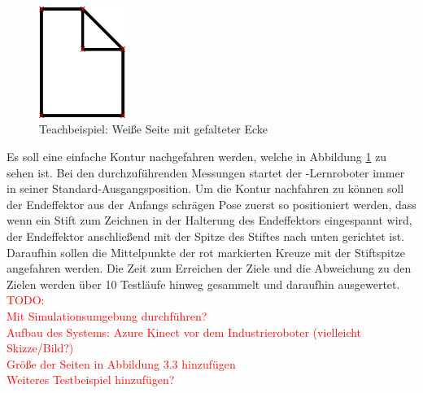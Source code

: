 \begin{figure}[htb]
	\centering
	\includegraphics[width=0.25\textwidth]{images/loesungsweg/white-page-with-folded-corner}
	\caption[Teachbeispiel: Weiße Seite mit gefalteter Ecke]{Teachbeispiel: Weiße Seite mit gefalteter Ecke}
	\label{fig:white_page_with_folded_corner}
\end{figure}
\FloatBarrier

Es soll eine einfache Kontur nachgefahren werden, welche in Abbildung \ref{fig:white_page_with_folded_corner} zu sehen ist. Bei den durchzuführenden Messungen startet der -Lernroboter immer in seiner Standard-Ausgangsposition. Um die Kontur nachfahren zu können soll der Endeffektor aus der Anfangs schrägen Pose zuerst so positioniert werden, dass wenn ein Stift zum Zeichnen in der Halterung des Endeffektors eingespannt wird, der Endeffektor anschließend mit der Spitze des Stiftes nach unten gerichtet ist. Daraufhin sollen die Mittelpunkte der rot markierten Kreuze mit der Stiftspitze angefahren werden. Die Zeit zum Erreichen der Ziele und die Abweichung zu den Zielen werden über 10 Testläufe hinweg gesammelt und daraufhin ausgewertet.\\


\textcolor{red}{TODO:\\
Mit Simulationsumgebung durchführen?\\
Aufbau des Systems: Azure Kinect vor dem Industrieroboter (vielleicht Skizze/Bild?)\\
Größe der Seiten in Abbildung 3.3 hinzufügen\\
Weiteres Testbeispiel hinzufügen?
}
